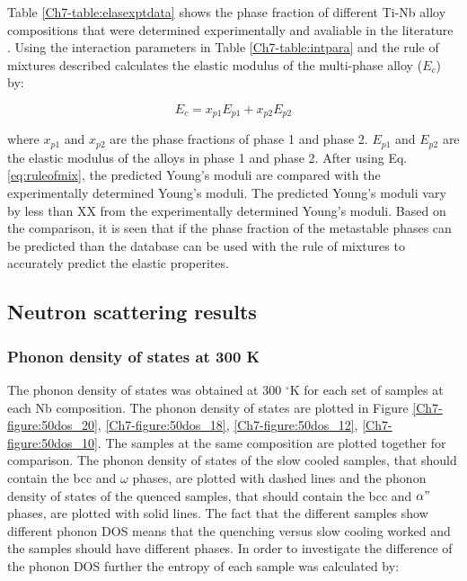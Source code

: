Table \ref{Ch7-table:elasexptdata} shows the phase fraction of different Ti-Nb alloy compositions that were determined experimentally and avaliable in the literature \cite{Ozaki2004,Timoshevskii2011,Friak2012,Karre2015}. Using the interaction parameters in Table \ref{Ch7-table:intpara} and the rule of mixtures described calculates the elastic modulus of the multi-phase alloy ($E_{c}$) by:

\begin{equation}
\label{eq:ruleofmix}
E_{c}=x_{p1}E_{p1}+x_{p2}E_{p2}
\end{equation}

\noindent where $x_{p1}$ and $x_{p2}$ are the phase fractions of phase 1 and phase 2. $E_{p1}$ and $E_{p2}$ are the elastic modulus of the alloys in phase 1 and phase 2. After using Eq. \ref{eq:ruleofmix}, the predicted Young's moduli are compared with the experimentally determined Young's moduli. The predicted Young's moduli vary by less than XX from the experimentally determined Young's moduli. Based on the comparison, it is seen that if the phase fraction of the metastable phases can be predicted than the database can be used with the rule of mixtures to accurately predict the elastic properites. 

\subsection{Neutron scattering results}

\subsubsection{Phonon density of states at 300 K}

The phonon density of states was obtained at 300 $^\circ$K for each set of samples at each Nb composition. The phonon density of states are plotted in Figure \ref{Ch7-figure:50dos_20}, \ref{Ch7-figure:50dos_18}, \ref{Ch7-figure:50dos_12}, \ref{Ch7-figure:50dos_10}. The samples at the same composition are plotted together for comparison. The phonon density of states of the slow cooled samples, that should contain the bcc and $\omega$ phases, are plotted with dashed lines and the phonon density of states of the quenced samples, that should contain the bcc and $\alpha "$ phases, are plotted with solid lines. The fact that the different samples show different phonon DOS means that the quenching versus slow cooling worked and the samples should have different phases. In order to investigate the difference of the phonon DOS further the entropy of each sample was calculated by:

